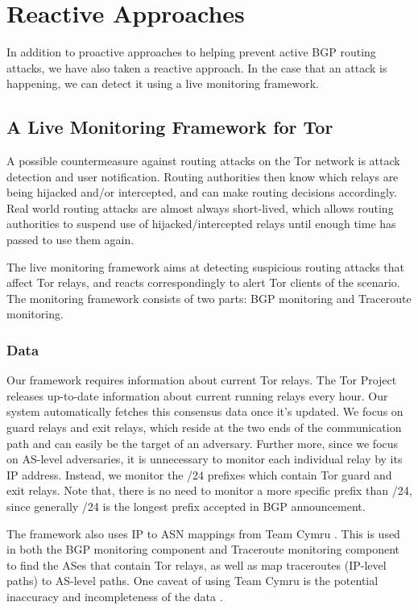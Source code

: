 \section{Reactive Approaches}
In addition to proactive approaches to helping prevent active BGP routing attacks, we have also taken a reactive approach.  In the case that an attack is happening, we can detect it using a live monitoring framework.

\subsection{A Live Monitoring Framework for Tor}
A possible countermeasure against routing attacks on the Tor network is attack 
detection and user notification.  Routing authorities then know which relays are 
being hijacked and/or intercepted, and can make routing decisions accordingly.  
Real world routing attacks are almost always short-lived, which allows 
routing authorities to suspend use of hijacked/intercepted relays until enough 
time has passed to use them again.

The live monitoring framework aims at detecting suspicious routing attacks that affect Tor relays, and reacts correspondingly to alert Tor clients of the scenario. The monitoring framework consists of two parts: BGP monitoring and Traceroute monitoring.\\

\subsubsection{Data} 
\label{sec:data}
Our framework requires information about current Tor relays.  The Tor Project releases up-to-date information about current running relays every hour. Our system automatically fetches this consensus data once it's updated. We focus on guard relays and exit relays, which reside at the two ends of the communication path and can easily be the target of an adversary. Further more, since we focus on AS-level adversaries, it is unnecessary to monitor each individual relay by its IP address. Instead, we monitor the /24 prefixes which contain Tor guard and exit relays. Note that, there is no need to monitor a more specific prefix than /24, since generally /24 is the longest prefix accepted in BGP announcement.

The framework also uses IP to ASN mappings from Team Cymru \cite{teamcymru}.  This is used in both the BGP monitoring component and Traceroute monitoring component to find the ASes that contain Tor relays, as well as map traceroutes (IP-level paths) to AS-level paths.  One caveat of using Team Cymru is the potential inaccuracy and incompleteness of the data .

